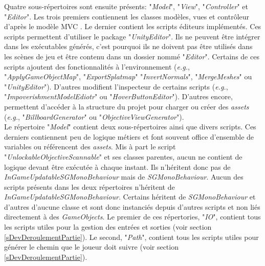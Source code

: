 		Quatre sous-répertoires sont ensuite présents: "\textit{Model}", "\textit{View}", "\textit{Controller}" et "\textit{Editor}". Les trois premiers contiennent les classes modèles, vues et contrôleur d'après le modèle MVC \cite{UnityMVC}. Le dernier contient les scripts éditeurs implémentés. Ces scripts permettent d'utiliser le package "\textit{UnityEditor}". Ils ne peuvent être intégrer dans les exécutables générés, c'est pourquoi ils ne doivent pas être utilisés dans les scènes de jeu et être contenu dans un dossier nommé  "\textit{Editor}". Certains de ces scripts ajoutent des fonctionnalités à l'environnement (\textit{e.g.}, "\textit{ApplyGameObjectMap}", "\textit{ExportSplatmap}" "\textit{InvertNormals}", "\textit{MergeMeshes}" ou "\textit{UnityEditor}"). D'autres modifient l'inspecteur de certains scripts (\textit{e.g.},  "\textit{ImpoverishmentModelEdiotr}" ou "\textit{HoverButtonEditor}"). D'autres encore, permettent d'accéder à la structure du projet pour charger ou créer des \textit{assets} (\textit{e.g.}, "\textit{BillboardGenerator}" ou "\textit{ObjectiveViewGenerator}").
		\\
		
		Le répertoire "\textit{Model}" contient deux sous-répertoires ainsi que divers scripts. Ces derniers contiennent peu de logique métiers et font souvent office d'ensemble de variables ou référencent des \textit{assets}. Mis à part le script "\textit{UnlockableObjectiveScannable}" et ses classes parentes, aucun ne contient de logique devant être exécutée à chaque instant. Ils n'héritent donc pas de \textit{InGameUpdatableSGMonoBehaviour} mais de \textit{SGMonoBehaviour}. %
		Aucun des scripts présents dans les deux répertoires n'héritent de \textit{InGameUpdatableSGMonoBehaviour}. Certains héritent de \textit{SGMonoBehaviour} et d'autres d'aucune classe et sont donc instanciés depuis d'autres scripts et non liés directement à des \textit{GameObjects}. Le premier de ces répertories, "\textit{IO}", contient tous les scripts utiles pour la gestion des entrées et sorties (voir section \ref{sDevDeroulementPartie}). Le second, "\textit{Path}", contient tous les scripts utiles pour générer le chemin que le joueur doit suivre (voir section \ref{sDevDeroulementPartie}).
		\\
		

